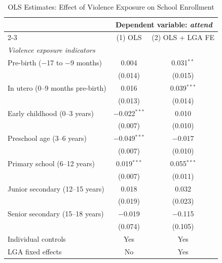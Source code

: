 
\begin{table}[H]
    \centering
    \caption{OLS Estimates: Effect of Violence Exposure on School Enrollment}
    \label{tab:attend_results}
    \begin{threeparttable}
        \begin{tabular}{lcc}
            \toprule
            & \multicolumn{2}{c}{Dependent variable: \textit{attend}} \\
            \cmidrule(lr){2-3}
            & (1) OLS & (2) OLS + LGA FE \\
            \midrule
            \multicolumn{3}{l}{\textit{Violence exposure indicators}} \\[0.3em]
            Pre-birth ($-$17 to $-$9 months) & 0.004 & 0.031$^{**}$ \\
                                          & (0.014) & (0.015) \\[0.3em]
            In utero (0–9 months pre-birth) & 0.016 & 0.039$^{***}$ \\
                                             & (0.013) & (0.014) \\[0.3em]
            Early childhood (0–3 years) & $-$0.022$^{***}$ & 0.010 \\
                                         & (0.007) & (0.010) \\[0.3em]
            Preschool age (3–6 years) & $-$0.049$^{***}$ & $-$0.017 \\
                                       & (0.007) & (0.010) \\[0.3em]
            Primary school (6–12 years) & 0.019$^{***}$ & 0.055$^{***}$ \\
                                         & (0.007) & (0.011) \\[0.3em]
            Junior secondary (12–15 years) & 0.018 & 0.032 \\
                                            & (0.019) & (0.023) \\[0.3em]
            Senior secondary (15–18 years) & $-$0.019 & $-$0.115 \\
                                            & (0.074) & (0.105) \\[0.5em]
            Individual controls & Yes & Yes \\
            LGA fixed effects   & No  & Yes \\

\end{tabular}
\end{threeparttable}
\end{table}
